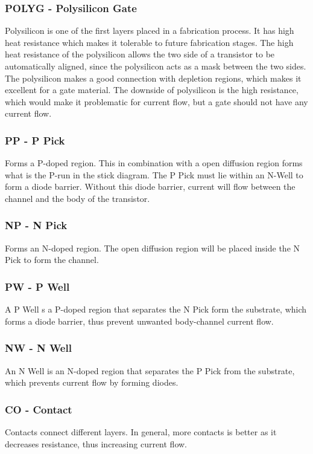 \documentclass[11pt]{article}
\begin{document}
		\subsubsection{POLYG - Polysilicon Gate}
		Polysilicon is one of the first layers placed in a fabrication process. It has high heat resistance which makes it tolerable to future fabrication stages. The high heat resistance of the polysilicon allows the two side of a transistor to be automatically aligned, since the polysilicon acts as a mask between the two sides. The polysilicon makes a good connection with depletion regions, which makes it excellent for a gate material. The downside of polysilicon is the high resistance, which would make it problematic for current flow, but a gate should not have any current flow. 
		
		\subsubsection{PP - P Pick}
		Forms a P-doped region. This in combination with a open diffusion region forms what is the P-run in the stick diagram. The P Pick must lie within an N-Well to form a diode barrier. Without this diode barrier, current will flow between the channel and the body of the transistor. 
		
		\subsubsection{NP - N Pick}
		Forms an N-doped region. The open diffusion region will be placed inside the N Pick to form the channel.
		
		\subsubsection{PW - P Well}
		A P Well s a P-doped region that separates the N Pick form the substrate, which forms a diode barrier, thus prevent unwanted body-channel current flow. 
		
		\subsubsection{NW - N Well}
		An N Well is an N-doped region that separates the P Pick from the substrate, which prevents current flow by forming diodes. 
		
		\subsubsection{CO - Contact}
		Contacts connect different layers. In general, more contacts is better as it decreases resistance, thus increasing current flow. 
		
\end{document}
